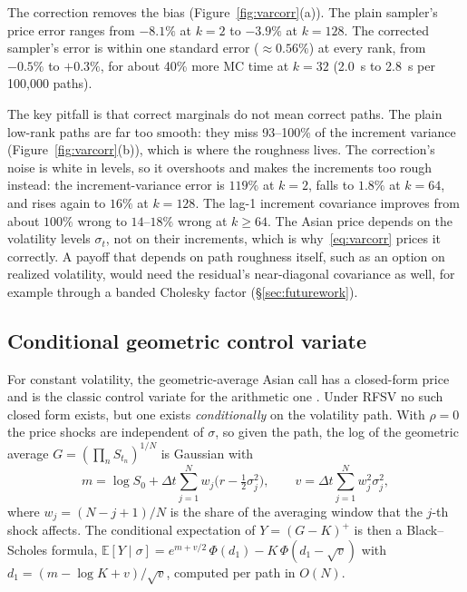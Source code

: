 The correction removes the bias (Figure~\ref{fig:varcorr}(a)).  The plain sampler's
price error ranges from $-8.1\%$ at $k = 2$ to $-3.9\%$ at $k = 128$.  The corrected
sampler's error is within one standard error ($\approx 0.56\%$) at every rank, from
$-0.5\%$ to $+0.3\%$, for about 40\% more MC time at $k = 32$ (2.0~s to 2.8~s per
100{,}000 paths).

The key pitfall is that correct marginals do not mean correct paths.  The plain
low-rank paths are far too smooth: they miss 93--100\% of the increment variance
(Figure~\ref{fig:varcorr}(b)), which is where the roughness lives.  The correction's
noise is white in levels, so it overshoots and makes the increments too rough instead:
the increment-variance error is $119\%$ at $k = 2$, falls to $1.8\%$ at $k = 64$, and rises
again to $16\%$ at $k = 128$.  The lag-1 increment covariance improves from about $100\%$
wrong to $14$--$18\%$ wrong at $k \geq 64$.  The Asian price depends on the volatility
levels $\sigma_t$, not on their increments, which is why~\eqref{eq:varcorr} prices it
correctly.  A payoff that depends on path roughness itself, such as an option on
realized volatility, would need the residual's near-diagonal covariance as well, for
example through a banded Cholesky factor (§\ref{sec:futurework}).

\subsection{Conditional geometric control variate}
\label{sec:cv}

For constant volatility, the geometric-average Asian call has a closed-form price
\citep{kemna1990pricing} and is the classic control variate for the arithmetic one
\citep{glasserman2004monte}.  Under RFSV no such closed form exists, but one exists
\emph{conditionally} on the volatility path.  With $\rho = 0$ the price shocks are
independent of $\sigma$, so given the path, the log of the geometric average
$G = (\prod_{n} S_{t_n})^{1/N}$ is Gaussian with
\begin{equation}
  \label{eq:geomcond}
  m = \log S_0 + \Delta t \sum_{j=1}^{N} w_j\bigl(r - \tfrac{1}{2}\sigma_j^2\bigr),
  \qquad
  v = \Delta t \sum_{j=1}^{N} w_j^2 \sigma_j^2,
\end{equation}
where $w_j = (N - j + 1)/N$ is the share of the averaging window that the $j$-th shock
affects.  The
conditional expectation of $Y = (G - K)^+$ is then a Black--Scholes formula,
$\mathbb{E}[Y \mid \sigma] = e^{m + v/2}\,\Phi(d_1) - K\,\Phi(d_1 - \sqrt{v})$ with
$d_1 = (m - \log K + v)/\sqrt{v}$, computed per path in $O(N)$.

